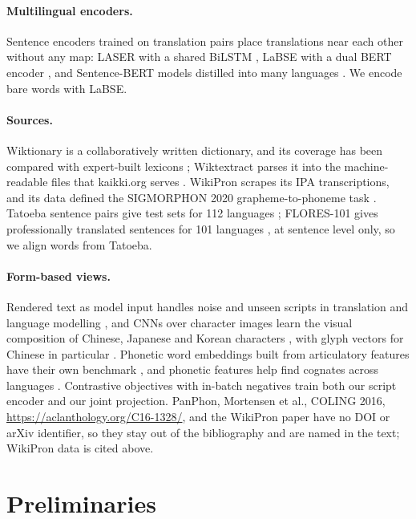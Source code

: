 \documentclass[11pt]{article}
\begin{document}
\paragraph{Multilingual encoders.} Sentence encoders trained on translation pairs place translations near each other without any map: LASER with a shared BiLSTM \cite{artetxe2019laser}, LaBSE with a dual BERT encoder \cite{feng2020labse}, and Sentence-BERT models distilled into many languages \cite{reimers2019sbert,reimers2020distill}. We encode bare words with LaBSE.

\paragraph{Sources.} Wiktionary is a collaboratively written dictionary, and its coverage has been compared with expert-built lexicons \cite{meyer2012wiktionary}; Wiktextract parses it into the machine-readable files that kaikki.org serves \cite{ylonen2022wiktextract}. WikiPron scrapes its IPA transcriptions, and its data defined the SIGMORPHON 2020 grapheme-to-phoneme task \cite{gorman2020sigmorphon,wikipa2026}. Tatoeba sentence pairs give test sets for 112 languages \cite{artetxe2019laser,tiedemann2020tatoeba}; FLORES-101 gives professionally translated sentences for 101 languages \cite{goyal2022flores}, at sentence level only, so we align words from Tatoeba.

\paragraph{Form-based views.} Rendered text as model input handles noise and unseen scripts in translation and language modelling \cite{salesky2021visrep,rust2022pixel}, and CNNs over character images learn the visual composition of Chinese, Japanese and Korean characters \cite{liu2017visual}, with glyph vectors for Chinese in particular \cite{meng2019glyce}. Phonetic word embeddings built from articulatory features have their own benchmark \cite{zouhar2023pwesuite}, and phonetic features help find cognates across languages \cite{rama2016siamese}. Contrastive objectives with in-batch negatives \cite{oord2018cpc,chen2020simclr} train both our script encoder and our joint projection. PanPhon, Mortensen et al., COLING 2016, \url{https://aclanthology.org/C16-1328/}, and the WikiPron paper have no DOI or arXiv identifier, so they stay out of the bibliography and are named in the text; WikiPron data is cited above.

\section{Preliminaries}
\label{sec:prelim}
\end{document}
